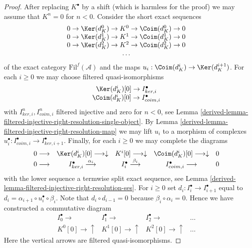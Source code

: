 \begin{proof}
After replacing $K^\bullet$ by a shift (which is harmless for the proof)
we may assume that $K^n = 0$ for $n < 0$. Consider the
short exact sequences
$$
\begin{matrix}
0 \to \Ker(d_K^0) \to K^0 \to \Coim(d_K^0) \to 0 \\
0 \to \Ker(d_K^1) \to K^1 \to \Coim(d_K^1) \to 0 \\
0 \to \Ker(d_K^2) \to K^2 \to \Coim(d_K^2) \to 0 \\
\ldots
\end{matrix}
$$
of the exact category $\text{Fil}^f(\mathcal{A})$
and the maps $u_i : \Coim(d_K^i) \to \Ker(d_K^{i + 1})$.
For each $i \geq 0$ we may choose filtered quasi-isomorphisms
$$
\begin{matrix}
\Ker(d_K^i)[0] \to I_{ker, i}^\bullet \\
\Coim(d_K^i)[0] \to I_{coim, i}^\bullet
\end{matrix}
$$
with $I_{ker, i}^n, I_{coim, i}^n$ filtered injective and zero for $n < 0$, see
Lemma \ref{derived-lemma-filtered-injective-right-resolution-single-object}.
By
Lemma \ref{derived-lemma-filtered-injective-right-resolution-map}
we may lift $u_i$ to a morphism of complexes
$u_i^\bullet : I_{coim, i}^\bullet \to I_{ker, i + 1}^\bullet$.
Finally, for each $i \geq 0$ we may complete the diagrams
$$
\begin{array}{ccccc}0 \longrightarrow & \Ker(d_K^i)[0] \longrightarrow\downarrow & K^i[0] \longrightarrow\downarrow & \Coim(d_K^i)[0] \longrightarrow\downarrow & 0 \\ 0 \longrightarrow & I_{ker, i}^\bullet \overset{\alpha_i}{\longrightarrow} & I_i^\bullet \overset{\beta_i}{\longrightarrow} & I_{coim, i}^\bullet \longrightarrow & 0\end{array}
$$
with the lower sequence a termwise split exact sequence, see
Lemma \ref{derived-lemma-filtered-injective-right-resolution-ses}.
For $i \geq 0$ set $d_i : I_i^\bullet \to I_{i + 1}^\bullet$
equal to $d_i =  \alpha_{i + 1} \circ u_i^\bullet \circ \beta_i$.
Note that $d_i \circ d_{i - 1} = 0$ because
$\beta_i \circ \alpha_i = 0$. Hence we have constructed
a commutative diagram
$$
\begin{array}{cccc}I_0^\bullet \longrightarrow & I_1^\bullet \longrightarrow & I_2^\bullet \longrightarrow & \ldots \\ K^0[0] \longrightarrow\uparrow & K^1[0] \longrightarrow\uparrow & K^2[0] \longrightarrow\uparrow & \ldots\end{array}
$$
Here the vertical arrows are filtered quasi-isomorphisms.

\end{proof}
